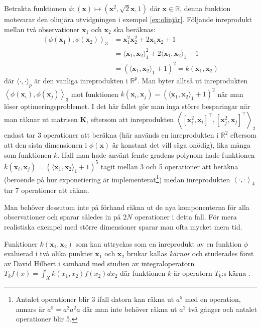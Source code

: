 \documentclass[a4paper, 12pt]{report}
\theoremstyle{definition}
\theoremstyle{remark}
\newcommand{\bfx}{\mathbf{x}}
\newcommand{\llangle}{\left\langle}
\newcommand{\rrangle}{\right\rangle}
\newcommand{\inner}[2]{\llangle #1, #2 \rrangle}
\begin{document}
	Betrakta funktionen $\phi:\left(\bfx\right)\longmapsto \left(\bfx^2,\sqrt{2}\bfx, 1\right)$ där $\bfx\in\mathbb{R}$, denna funktion motsvarar den olinjära utvidgningen i exempel \ref{ex:olinjär}. Följande inreprodukt mellan två observationer $\mathbf{x}_1$ och $\mathbf{x}_2$ ska beräknas:
	\begin{align*}
	\left\langle \phi\left(\mathbf{x}_1\right), \phi\left(\mathbf{x}_2\right) \right\rangle_3 &= \bfx_1^2\bfx_2^2 + 2\bfx_1\bfx_2 + 1\\
	&= \langle \bfx_1, \bfx_2 \rangle_1^2 + 2\langle \bfx_1, \bfx_2 \rangle_1 + 1\\
	&= \left(\langle\bfx_1, \bfx_2 \rangle_1 + 1\right)^2 = k\left(\bfx_1, \bfx_2\right)
	\end{align*}
	där $\langle \cdot, \cdot \rangle_p$ är den vanliga inreprodukten i $\mathbb{R}^p$. Man byter alltså ut inreprodukten $\inner{\phi\left(\bfx_i\right)}{\phi\left(\bfx_j\right)}_3$ mot funktionen $k\left(\bfx_i,\bfx_j\right)=\left(\langle\bfx_1, \bfx_2 \rangle_1 + 1\right)^2$ när man löser optimeringsproblemet. I det här fallet gör man inga större besparingar när man räknar ut matrisen $\mathbf{K}$, eftersom att inreprodukten $\inner{[\bfx_i^2, \bfx_i]^\intercal}{[\bfx_j^2, \bfx_j]^\intercal}_2$ endast tar 3 operationer att beräkna (här används en inreprodukten i $\mathbb{R}^2$  eftersom att den sista dimensionen i $\phi(\bfx)$ är konstant det vill säga onödig), lika många som funktionen $k$. Ifall man hade använt femte gradens polynom hade funktionen $k\left(\bfx_i,\bfx_j\right)=\left(\langle\bfx_1, \bfx_2 \rangle_1 + 1\right)^5$ tagit mellan 3 och 5 operationer att beräkna (beroende på hur exponetiering är implementerat\footnote{Antalet operationer blir 3 ifall datorn kan räkna ut $a^5$ med en operation, annars är $a^5=a^2a^2a$ där man inte behöver räkna ut $a^2$ två gånger och antalet operationer blir 5.}) medan inreprodukten $\inner{\cdot}{\cdot}_4$ tar 7 operationer att räkna.
	
	Man behöver dessutom inte på förhand räkna ut de nya komponenterna för alla observationer och sparar således in på $2N$ operationer i detta fall. För mera realistiska exempel med större dimensioner sparar man ofta mycket mera tid.

Funktioner $k\left(\bfx_1, \bfx_2\right)$ som kan uttryckas som en inreprodukt av en funktion $\phi$ evaluerad i två olika punkter $\bfx_1$ och $\bfx_2$ brukar kallas \emph{kärnor} och studerades först av David Hilbert \cite{Hilbert} i samband med studien av integraloperatorn $T_k f\left(x\right)=\int_{X}k\left(x_1, x_2\right)f\left(x_2\right)dx_2$ där funktionen $k$ är operatorn $T_k$:s kärna \cite{LearningKernels}.
\end{document}
